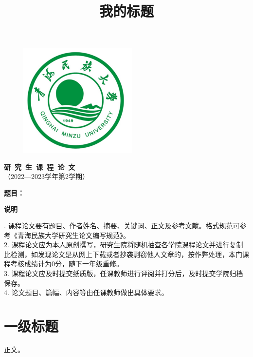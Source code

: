 \documentclass[preprint,3p]{elsarticle}
\begin{document}
\title{我的标题}
\makeatletter\let\Title\@title\makeatother

\begin{titlepage}
    \begin{center}
        \begin{figure}[H]
            \centering
            \includegraphics[width=2.33in]{QUN-logo.png}
        \end{figure}
        \textbf{\Huge 研~究~生~课~程~论~文} \\
        \vspace{0.1in} （2022—2023学年第2学期）
    \end{center}
    \vspace{0.2in} \textbf{\LARGE \raggedleft 题目：\Title}
    \begin{center}
        \vspace{0.2in} \textbf{\LARGE 说明} \\
    \end{center}

\begin{doublespace}
{ . 课程论文要有题目、作者姓名、摘要、关键词、正文及参考文献。格式规范可参考《青海民族大学研究生论文编写规范》。 \\
2. 课程论文应为本人原创撰写，研究生院将随机抽查各学院课程论文并进行复制比检测，如发现论文是从网上下载或者抄袭剽窃他人文章的，按作弊处理，本门课程考核成绩计为0分，随下一年级重修。 \\
3. 课程论文应及时提交纸质版，任课教师进行评阅并打分后，及时提交学院归档保存。 \\
4. 论文题目、篇幅、内容等由任课教师做出具体要求。
}   
\end{doublespace}

\end{titlepage}


\newpage


\section{一级标题}

正文。





\newpage
\appendix
\end{document}
